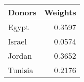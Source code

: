 \begin{tabular}{lr}
\toprule
 Donors &  Weights \\
\midrule
  Egypt &   0.3597 \\
 Israel &   0.0574 \\
 Jordan &   0.3652 \\
Tunisia &   0.2176 \\
\bottomrule
\end{tabular}
